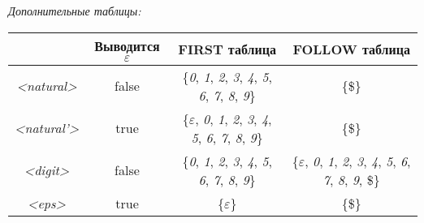 \documentclass[10pt,twoside,a4paper]{memoir}
\begin{document}
\begin{center}
\textsl{Дополнительные таблицы:}

\begin{tabular}{ |c||c|c|c| }
\hline
 & Выводится $\varepsilon$ & FIRST таблица & FOLLOW таблица \\
\hline\hline
\textsl{\textless natural\textgreater} & false & \{\textit{0}, \textit{1}, \textit{2}, \textit{3}, \textit{4}, \textit{5}, \textit{6}, \textit{7}, \textit{8}, \textit{9}\} & \{\$\}\\ \hline
\textsl{\textless natural'\textgreater} & true & \{$\varepsilon$, \textit{0}, \textit{1}, \textit{2}, \textit{3}, \textit{4}, \textit{5}, \textit{6}, \textit{7}, \textit{8}, \textit{9}\} & \{\$\}\\ \hline
\textsl{\textless digit\textgreater} & false & \{\textit{0}, \textit{1}, \textit{2}, \textit{3}, \textit{4}, \textit{5}, \textit{6}, \textit{7}, \textit{8}, \textit{9}\} & \{$\varepsilon$, \textit{0}, \textit{1}, \textit{2}, \textit{3}, \textit{4}, \textit{5}, \textit{6}, \textit{7}, \textit{8}, \textit{9}, \$\}\\ \hline
\textsl{\textless eps\textgreater} & true & \{$\varepsilon$\} & \{\$\}\\
\hline
\end{tabular}

\end{center}     
\end{document}
